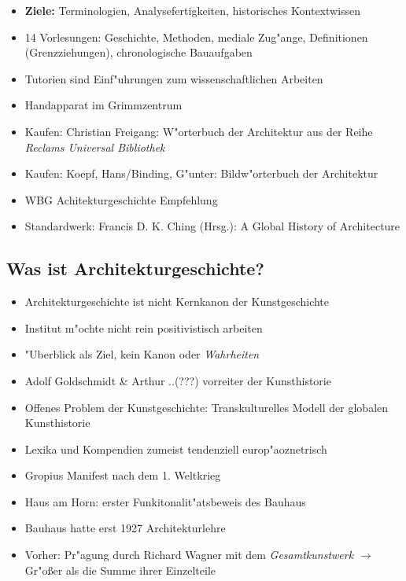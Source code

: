 \documentclass[emulatestandardclasses]{scrartcl}
\begin{document}
\begin{itemize}
    \item \textbf{Ziele:} Terminologien, Analysefertigkeiten, historisches Kontextwissen
\item 14 Vorlesungen: Geschichte, Methoden, mediale Zug"ange, Definitionen (Grenzziehungen), chronologische Bauaufgaben
\item Tutorien sind Einf"uhrungen zum wissenschaftlichen Arbeiten
  \item Handapparat im Grimmzentrum
  \item Kaufen: Christian Freigang: W"orterbuch der Architektur aus der Reihe \emph{Reclams Universal Bibliothek}
    \item Kaufen: Koepf, Hans/Binding, G"unter: Bildw"orterbuch der Architektur
    \item WBG Achitekturgeschichte Empfehlung
    \item Standardwerk: Francis D. K. Ching (Hrsg.): A Global History of Architecture
    

\end{itemize}


\subsection{Was ist Architekturgeschichte?}

\begin{itemize}

    \item Architekturgeschichte ist nicht Kernkanon der Kunstgeschichte
    \item Institut m"ochte nicht rein positivistisch arbeiten
    \item "Uberblick als Ziel, kein Kanon oder \emph{Wahrheiten}
    \item Adolf Goldschmidt \& Arthur ..{\color{red}(???)} vorreiter der Kunsthistorie
    \item Offenes Problem der Kunstgeschichte: Transkulturelles Modell der globalen Kunsthistorie
    \item Lexika und Kompendien zumeist tendenziell europ"aoznetrisch
    \item Gropius Manifest nach dem 1. Weltkrieg
    \item Haus am Horn: erster Funkitonalit"atsbeweis des Bauhaus
    \item Bauhaus hatte erst 1927 Architekturlehre
    \item Vorher: Pr"agung durch Richard Wagner mit dem \emph{Gesamtkunstwerk} $\rightarrow$ Gr"oßer als die Summe ihrer Einzelteile

\end{itemize}
\end{document}
